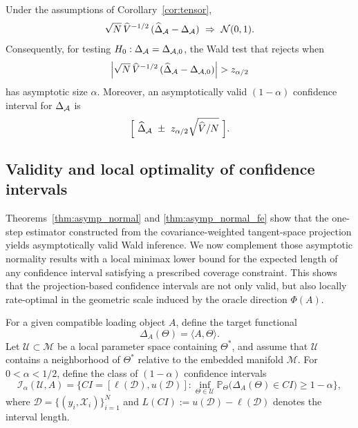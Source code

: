 \documentclass[authoryear,preprint,review,12pt]{elsarticle}
\begin{document}
	\begin{cor}\label{cor:wald-tensor2}
		Under the assumptions of Corollary~\ref{cor:tensor},
		\[
		\sqrt{N}\,\widehat V^{-1/2}\,(\widehat\Delta_{\mathcal{A}}-\Delta_{\mathcal{A}})\ \Rightarrow\ \mathcal N(0,1).
		\]
		Consequently, for testing $H_0:\Delta_{\mathcal{A}}=\Delta_{\mathcal{A},0}$, the Wald test that rejects when
		\[
		\Big|\sqrt{N}\,\widehat V^{-1/2}\,(\widehat\Delta_{\mA}-\Delta_{\mA,0})\Big|> z_{\alpha/2}
		\]
		has asymptotic size $\alpha$.
		Moreover, an asymptotically valid $(1-\alpha)$ confidence interval for $\Delta_{\mathcal{A}}$ is
		\[
		\Big[\ \widehat\Delta_{\mA} \ \pm\ z_{\alpha/2}\sqrt{\widehat V/N}\ \Big].
		\]
	\end{cor} 
	
	
\subsection{Validity and local optimality of confidence intervals}
Theorems~\ref{thm:asymp_normal} and \ref{thm:asymp_normal_fe} show that the one-step estimator constructed from the covariance-weighted tangent-space projection yields asymptotically valid Wald inference.
We now complement those asymptotic normality results with a local minimax lower bound for the expected length of any confidence interval satisfying a prescribed coverage constraint.
This shows that the projection-based confidence intervals are not only valid, but also locally rate-optimal in the geometric scale induced by the oracle direction $\Phi(A)$.

For a given compatible loading object $A$, define the target functional
\[
\Delta_A(\Theta)=\langle A,\Theta\rangle.
\]
Let $\mathcal U\subset \mathcal M$ be a local parameter space containing $\Theta^\ast$, and assume that $\mathcal U$ contains a neighborhood of $\Theta^\ast$ relative to the embedded manifold $\mathcal M$.
For $0<\alpha<1/2$, define the class of $(1-\alpha)$ confidence intervals
\[
\mathcal I_\alpha(\mathcal U,A)
=
\Big\{
CI=[\ell(\mathcal D),u(\mathcal D)]:
\inf_{\Theta\in\mathcal U}
\mathbb P_\Theta\bigl(\Delta_A(\Theta)\in CI\bigr)\ge 1-\alpha
\Big\},
\]
where $\mathcal D=\{(y_i,\mathcal X_i)\}_{i=1}^N$ and $L(CI):=u(\mathcal D)-\ell(\mathcal D)$ denotes the interval length.
\end{document}
